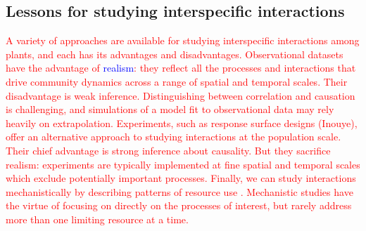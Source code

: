 \documentclass[11pt]{article}
\newcommand{\new}{\textcolor{red}}
\newcommand{\spe}{\textcolor{blue}}
\begin{document}
\begin{doublespacing}

\subsection*{Lessons for studying interspecific interactions}

\new{A variety of approaches are available for studying interspecific interactions among plants, and each has its advantages and disadvantages. Observational datasets have the advantage of \spe{realism}: they reflect all the processes and interactions that drive community dynamics across a range of spatial and temporal scales. Their disadvantage is weak inference. Distinguishing between correlation and causation is challenging, and simulations of a model fit to observational data may rely heavily on extrapolation. Experiments, such as response surface designs (Inouye), offer an alternative approach to studying interactions at the population scale. Their chief advantage is strong inference about causality. But they sacrifice realism: experiments are typically implemented at fine spatial and temporal scales which exclude potentially important processes.  Finally, we can study interactions mechanistically by describing patterns of resource use \citep{Dybzinski2007,Silvertown1999}. Mechanistic studies have the virtue of focusing on directly on the processes of interest, but rarely address more than one limiting resource at a time. }


\end{doublespacing}
\end{document}
